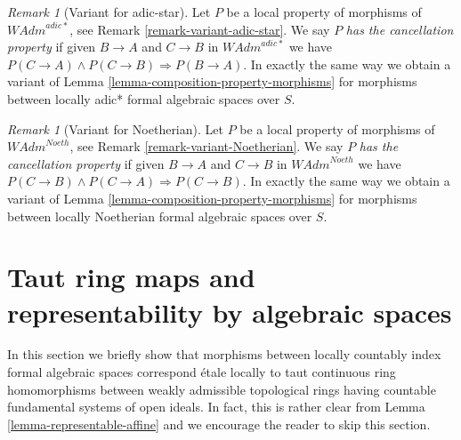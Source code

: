 \documentclass{stacks-project}
\theoremstyle{plain}
\theoremstyle{definition}
\theoremstyle{remark}
\newtheorem{remark}[subsection]{Remark}
\numberwithin{equation}{subsection}
\begin{document}
\begin{remark}[Variant for adic-star]
\label{remark-permanence-variant-adic-star}
Let $P$ be a local property of morphisms of $\textit{WAdm}^{adic*}$, see
Remark \ref{remark-variant-adic-star}. We say $P$ {\it has the cancellation
property} if given $B \to A$ and $C \to B$ in $\textit{WAdm}^{adic*}$
we have $P(C \to A) \wedge P(C \to B) \Rightarrow P(B \to A)$.
In exactly the same way we obtain a variant of
Lemma \ref{lemma-composition-property-morphisms}
for morphisms between locally adic* formal algebraic spaces over $S$.
\end{remark}

\begin{remark}[Variant for Noetherian]
\label{remark-permanence-variant-Noetherian}
Let $P$ be a local property of morphisms of $\textit{WAdm}^{Noeth}$, see
Remark \ref{remark-variant-Noetherian}. We say $P$
{\it has the cancellation property} if given $B \to A$ and $C \to B$
in $\textit{WAdm}^{Noeth}$ we have
$P(C \to B) \wedge P(C \to A) \Rightarrow P(C \to B)$.
In exactly the same way we obtain a variant of
Lemma \ref{lemma-composition-property-morphisms}
for morphisms between locally Noetherian formal algebraic spaces over $S$.
\end{remark}














\section{Taut ring maps and representability by algebraic spaces}
\label{section-taut}

\noindent
In this section we briefly show that morphisms between
locally countably index formal algebraic spaces correspond \'etale locally
to taut continuous ring homomorphisms between weakly admissible
topological rings having countable fundamental systems of open ideals.
In fact, this is rather clear from
Lemma \ref{lemma-representable-affine}
and we encourage the reader to skip this section.
\end{document}
